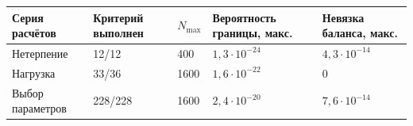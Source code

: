 \begin{tabular}{p{.20\linewidth}p{.14\linewidth}p{.10\linewidth}p{.19\linewidth}p{.23\linewidth}}
\hline
Серия расчётов & Критерий выполнен & $N_{\max}$ & Вероятность границы, макс. & Невязка баланса, макс. \\
\hline
Нетерпение & 12/12 & 400 & $1{,}3\cdot10^{-24}$ & $4{,}3\cdot10^{-14}$ \\
Нагрузка & 33/36 & 1600 & $1{,}6\cdot10^{-22}$ & $0$ \\
Выбор параметров & 228/228 & 1600 & $2{,}4\cdot10^{-20}$ & $7{,}6\cdot10^{-14}$ \\
\hline
\end{tabular}
